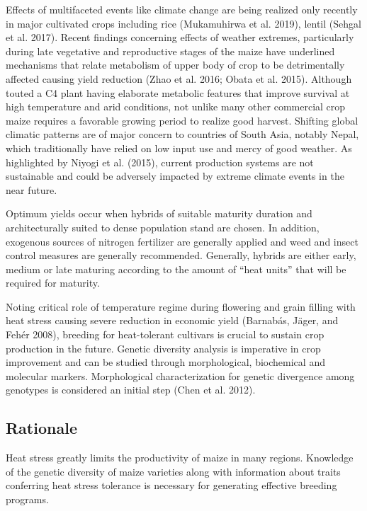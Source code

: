 \documentclass[
]{article}
\begin{document}
Effects of multifaceted events like climate change are being realized only recently in major cultivated crops including rice (Mukamuhirwa et al. 2019), lentil (Sehgal et al. 2017). Recent findings concerning effects of weather extremes, particularly during late vegetative and reproductive stages of the maize have underlined mechanisms that relate metabolism of upper body of crop to be detrimentally affected causing yield reduction (Zhao et al. 2016; Obata et al. 2015). Although touted a C4 plant having elaborate metabolic features that improve survival at high temperature and arid conditions, not unlike many other commercial crop maize requires a favorable growing period to realize good harvest. Shifting global climatic patterns are of major concern to countries of South Asia, notably Nepal, which traditionally have relied on low input use and mercy of good weather. As highlighted by Niyogi et al. (2015), current production systems are not sustainable and could be adversely impacted by extreme climate events in the near future.

Optimum yields occur when hybrids of suitable maturity duration and architecturally suited to dense population stand are chosen. In addition, exogenous sources of nitrogen fertilizer are generally applied and weed and insect control measures are generally recommended. Generally, hybrids are either early, medium or late maturing according to the amount of ``heat units'' that will be required for maturity.

Noting critical role of temperature regime during flowering and grain filling with heat stress causing severe reduction in economic yield (Barnabás, Jäger, and Fehér 2008), breeding for heat-tolerant cultivars is crucial to sustain crop production in the future. Genetic diversity analysis is imperative in crop improvement and can be studied through morphological, biochemical and molecular markers. Morphological characterization for genetic divergence among genotypes is considered an initial step (Chen et al. 2012).

\hypertarget{rationale}{%
\subsection{Rationale}\label{rationale}}

Heat stress greatly limits the productivity of maize in many regions. Knowledge of the genetic diversity of maize varieties along with information about traits conferring heat stress tolerance is necessary for generating effective breeding programs.
\end{document}
